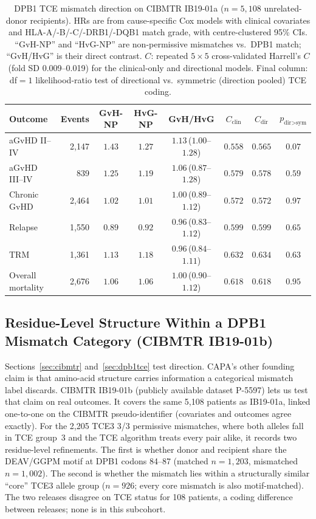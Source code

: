 \documentclass[11pt,a4paper]{article}
\begin{document}
\begin{table}[ht]
\centering
\caption{DPB1 TCE mismatch direction on CIBMTR IB19-01a ($n=5{,}108$
  unrelated-donor recipients).  HRs are from cause-specific Cox models with
  clinical covariates and HLA-A/-B/-C/-DRB1/-DQB1 match grade, with
  centre-clustered 95\% CIs.  ``GvH-NP'' and ``HvG-NP'' are non-permissive
  mismatches vs.\ DPB1 match; ``GvH/HvG'' is their direct contrast.
  $C$: repeated $5\times5$ cross-validated Harrell's $C$ (fold SD
  0.009--0.019) for the clinical-only and directional models.  Final column:
  df${}=1$ likelihood-ratio test of directional vs.\ symmetric (direction
  pooled) TCE coding.}
\label{tab:dpb1tce}
\small
\begin{tabular}{lrcccccc}
\toprule
Outcome & Events & GvH-NP & HvG-NP & GvH/HvG & $C_{\text{clin}}$ & $C_{\text{dir}}$
  & $p_{\text{dir}>\text{sym}}$ \\
\midrule
aGvHD II--IV      & 2{,}147 & $1.43$ & $1.27$ & $1.13$\,($1.00$--$1.28$) & $0.558$ & $0.565$ & $0.07$ \\
aGvHD III--IV     &    839 & $1.25$ & $1.19$ & $1.06$\,($0.87$--$1.28$) & $0.579$ & $0.578$ & $0.59$ \\
Chronic GvHD      & 2{,}464 & $1.02$ & $1.01$ & $1.00$\,($0.89$--$1.12$) & $0.572$ & $0.572$ & $0.97$ \\
Relapse           & 1{,}550 & $0.89$ & $0.92$ & $0.96$\,($0.83$--$1.12$) & $0.599$ & $0.599$ & $0.65$ \\
TRM               & 1{,}361 & $1.13$ & $1.18$ & $0.96$\,($0.84$--$1.11$) & $0.632$ & $0.634$ & $0.63$ \\
Overall mortality & 2{,}676 & $1.06$ & $1.06$ & $1.00$\,($0.90$--$1.12$) & $0.618$ & $0.618$ & $0.95$ \\
\bottomrule
\end{tabular}
\end{table}

\subsection{Residue-Level Structure Within a DPB1 Mismatch Category (CIBMTR IB19-01b)}
\label{sec:dpb1struct}

Sections~\ref{sec:cibmtr} and~\ref{sec:dpb1tce} test direction.  CAPA's
other founding claim is that amino-acid structure carries information a
categorical mismatch label discards.  CIBMTR IB19-01b (publicly available
dataset P-5597) lets us test that claim on real outcomes.  It covers the
same 5{,}108 patients as IB19-01a, linked one-to-one on the CIBMTR
pseudo-identifier (covariates and outcomes agree exactly).  For the 2{,}205
TCE3 3/3 permissive mismatches, where both alleles fall in TCE group~3 and
the TCE algorithm treats every pair alike, it records two residue-level
refinements.  The first is whether donor and recipient share the DEAV/GGPM
motif at DPB1 codons 84--87 (matched $n=1{,}203$, mismatched $n=1{,}002$).
The second is whether the mismatch lies within a structurally similar
``core'' TCE3 allele group ($n=926$; every core mismatch is also
motif-matched).  The two releases disagree on TCE status for 108 patients, a
coding difference between releases; none is in this subcohort.
\end{document}
